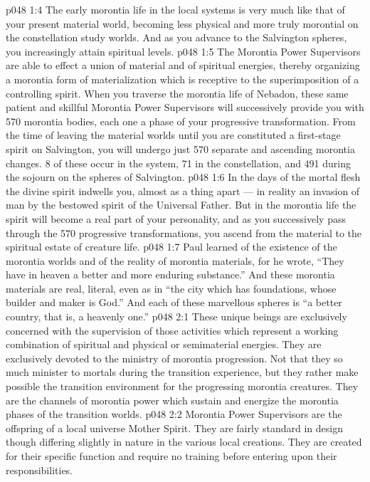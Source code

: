 \vs p048 1:4 \pc The early morontia life in the local systems is very much like that of your present material world, becoming less physical and more truly morontial on the constellation study worlds. And as you advance to the Salvington spheres, you increasingly attain spiritual levels.
\vs p048 1:5 The Morontia Power Supervisors are able to effect a union of material and of spiritual energies, thereby organizing a morontia form of materialization which is receptive to the superimposition of a controlling spirit. When you traverse the morontia life of Nebadon, these same patient and skillful Morontia Power Supervisors will successively provide you with 570 morontia bodies, each one a phase of your progressive transformation. From the time of leaving the material worlds until you are constituted a first\hyp{}stage spirit on Salvington, you will undergo just 570 separate and ascending morontia changes. 8 of these occur in the system, 71 in the constellation, and 491 during the sojourn on the spheres of Salvington.
\vs p048 1:6 In the days of the mortal flesh the divine spirit indwells you, almost as a thing apart --- in reality an invasion of man by the bestowed spirit of the Universal Father. But in the morontia life the spirit will become a real part of your personality, and as you successively pass through the 570 progressive transformations, you ascend from the material to the spiritual estate of creature life.
\vs p048 1:7 \pc Paul learned of the existence of the morontia worlds and of the reality of morontia materials, for he wrote, “They have in heaven a better and more enduring substance.” And these morontia materials are real, literal, even as in “the city which has foundations, whose builder and maker is God.” And each of these marvellous spheres is “a better country, that is, a heavenly one.”
\vs p048 2:1 These unique beings are exclusively concerned with the supervision of those activities which represent a working combination of spiritual and physical or semimaterial energies. They are exclusively devoted to the ministry of morontia progression. Not that they so much minister to mortals during the transition experience, but they rather make possible the transition environment for the progressing morontia creatures. They are the channels of morontia power which sustain and energize the morontia phases of the transition worlds.
\vs p048 2:2 Morontia Power Supervisors are the offspring of a local universe Mother Spirit. They are fairly standard in design though differing slightly in nature in the various local creations. They are created for their specific function and require no training before entering upon their responsibilities.
